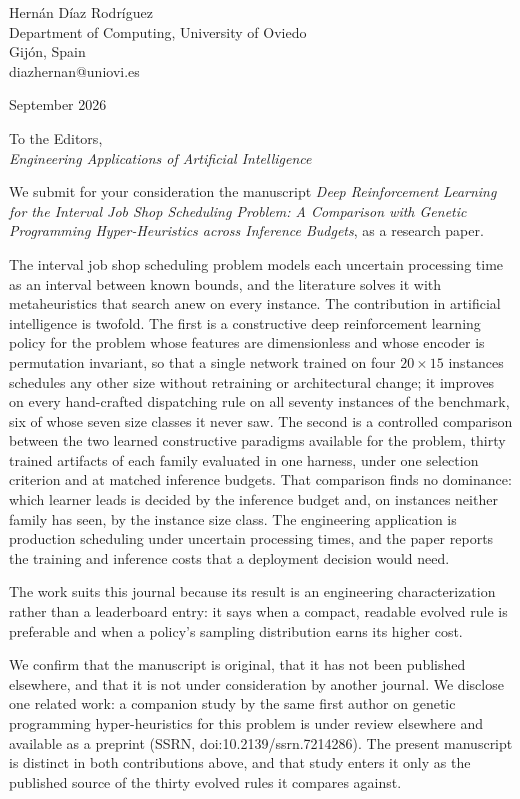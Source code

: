 \documentclass[11pt]{article}
\begin{document}
\noindent
Hern\'an D\'iaz Rodr\'iguez\\
Department of Computing, University of Oviedo\\
Gij\'on, Spain\\
diazhernan@uniovi.es

\vspace{1em}
 September 2026

\vspace{1em}
\noindent To the Editors,\\
\emph{Engineering Applications of Artificial Intelligence}

\vspace{1em}

We submit for your consideration the manuscript \emph{Deep
Reinforcement Learning for the Interval Job Shop Scheduling Problem:
A Comparison with Genetic Programming Hyper-Heuristics across
Inference Budgets}, as a research paper.

The interval job shop scheduling problem models each uncertain
processing time as an interval between known bounds, and the
literature solves it with metaheuristics that search anew on every
instance. The contribution in artificial intelligence is twofold. The
first is a constructive deep reinforcement learning policy for the
problem whose features are dimensionless and whose encoder is
permutation invariant, so that a single network trained on four
$20\times15$ instances schedules any other size without retraining or
architectural change; it improves on every hand-crafted dispatching
rule on all seventy instances of the benchmark, six of whose seven
size classes it never saw. The second is a controlled comparison
between the two learned constructive paradigms available for the
problem, thirty trained artifacts of each family evaluated in one
harness, under one selection criterion and at matched inference
budgets. That comparison finds no dominance: which learner leads is
decided by the inference budget and, on instances neither family has
seen, by the instance size class. The engineering application is
production scheduling under uncertain processing times, and the paper
reports the training and inference costs that a deployment decision
would need.

The work suits this journal because its result is an engineering
characterization rather than a leaderboard entry: it says when a
compact, readable evolved rule is preferable and when a policy's
sampling distribution earns its higher cost.

We confirm that the manuscript is original, that it has not been
published elsewhere, and that it is not under consideration by another
journal. We disclose one related work: a companion study by the same
first author on genetic programming hyper-heuristics for this problem
is under review elsewhere and available as a preprint (SSRN,
doi:10.2139/ssrn.7214286). The present manuscript is distinct in both
contributions above, and that study enters it only as the published
source of the thirty evolved rules it compares against.
\end{document}
